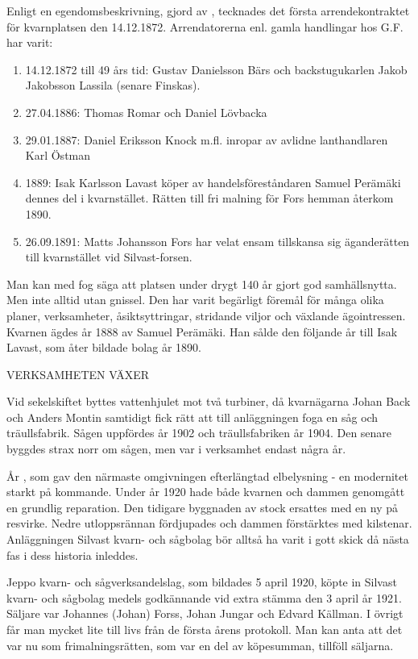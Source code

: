 Enligt en egendomsbeskrivning, gjord av , tecknades det första arrendekontraktet för kvarnplatsen den 14.12.1872. Arrendatorerna enl. gamla handlingar hos G.F. har varit:
\begin{enumerate}
  \item 14.12.1872 till 49 års tid: Gustav Danielsson Bärs och backstugukarlen Jakob Jakobsson Lassila (senare Finskas).
  \item 27.04.1886: Thomas Romar och Daniel Lövbacka
  \item 29.01.1887: Daniel Eriksson Knock m.fl. inropar av avlidne lanthandlaren Karl Östman
  \item 1889: Isak Karlsson Lavast köper av handelsföreståndaren Samuel Perämäki dennes del i kvarnstället. Rätten till fri malning för Fors hemman återkom 1890.
  \item 26.09.1891: Matts Johansson Fors har velat ensam tillskansa sig äganderätten till kvarnstället vid Silvast-forsen.
\end{enumerate}
Man kan med fog säga att platsen under drygt 140 år gjort god samhällsnytta. Men inte alltid utan gnissel. Den har varit begärligt föremål för många olika planer, verksamheter, åsiktsyttringar, stridande viljor och växlande ägointressen. Kvarnen ägdes år 1888 av Samuel Perämäki. Han sålde den följande år till Isak Lavast, som åter bildade bolag år 1890.


VERKSAMHETEN VÄXER

Vid sekelskiftet byttes vattenhjulet mot två turbiner, då kvarnägarna Johan Back och Anders Montin samtidigt fick rätt att till anläggningen foga en såg och träullsfabrik. Sågen uppfördes år 1902 och träullsfabriken år 1904. Den senare byggdes strax norr om sågen, men var i verksamhet endast några år.

År , som gav den närmaste omgivningen efterlängtad elbelysning - en modernitet starkt på kommande. Under år 1920 hade både kvarnen och dammen genomgått en grundlig reparation. Den tidigare byggnaden av stock ersattes med en ny på resvirke. Nedre utloppsrännan fördjupades och dammen förstärktes med kilstenar. Anläggningen Silvast kvarn- och sågbolag bör alltså ha varit i gott skick då nästa fas i dess historia inleddes.

Jeppo kvarn- och sågverksandelslag, som bildades 5 april 1920,  köpte in Silvast kvarn- och sågbolag medels godkännande vid extra stämma den 3 april år 1921. Säljare var Johannes (Johan) Forss, Johan Jungar och Edvard Källman. I övrigt får man mycket lite till livs från de första årens protokoll. Man kan anta att det var nu som frimalningsrätten, som var en del av köpesumman, tillföll säljarna.

